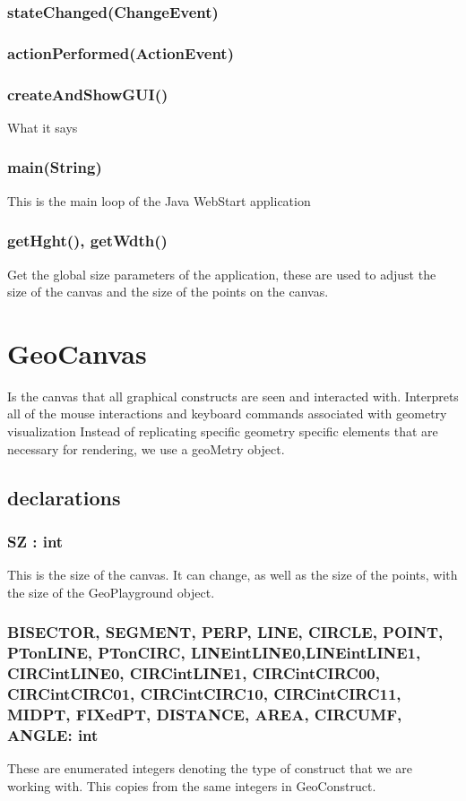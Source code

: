 \documentclass[a4paper,10pt]{report}
\begin{document}
\subsubsection{stateChanged(ChangeEvent)}
\subsubsection{actionPerformed(ActionEvent)}
\subsubsection{createAndShowGUI()} What it says
\subsubsection{main(String)} This is the main loop of the Java WebStart application
\subsubsection{getHght(), getWdth()} Get the global size parameters of the application, these are used to adjust the size of the canvas and the size of the points on the canvas.

\section{GeoCanvas}
  Is the canvas that all graphical constructs are seen and interacted with.
  Interprets all of the mouse interactions and keyboard commands associated with geometry visualization
  Instead of replicating specific geometry specific elements that are necessary for rendering, we use a geoMetry object.
 
 \subsection{declarations}
\subsubsection{SZ : int} This is the size of the canvas.  It can change, as well as the size of the points, with the size of the GeoPlayground object.
\subsubsection{BISECTOR, SEGMENT, PERP, LINE, CIRCLE, POINT, PTonLINE, PTonCIRC, LINEintLINE0,LINEintLINE1, CIRCintLINE0, CIRCintLINE1, CIRCintCIRC00, CIRCintCIRC01, CIRCintCIRC10, CIRCintCIRC11, MIDPT, FIXedPT, DISTANCE, AREA, CIRCUMF, ANGLE: int} These are enumerated integers denoting the type of construct that we are working with.  This copies from the same integers in GeoConstruct.
\end{document}
